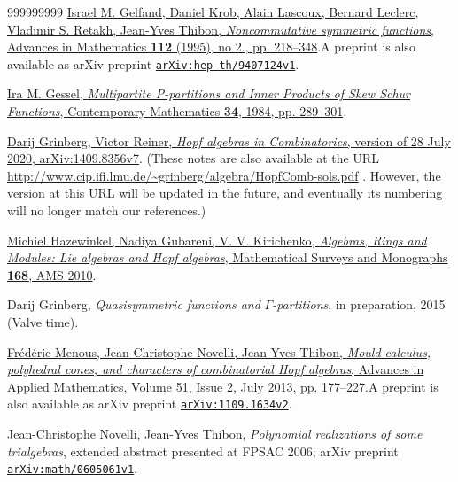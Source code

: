 \documentclass
[numbers=enddot,12pt,final,onecolumn,notitlepage,abstracton]{scrartcl}%
\theoremstyle{definition}
\newenvironment{noncompile}{}{}
\begin{document}
\begin{thebibliography}{999999999}
\href{https://doi.org/10.1006/aima.1995.1032}{Israel
M. Gelfand, Daniel Krob, Alain Lascoux, Bernard Leclerc, Vladimir S. Retakh,
Jean-Yves Thibon, \textit{Noncommutative symmetric functions}, Advances in
Mathematics \textbf{112} (1995), no 2., pp. 218--348}.\newline A preprint is
also available as arXiv preprint
\texttt{\href{https://arxiv.org/abs/hep-th/9407124v1}{arXiv:hep-th/9407124v1}}.

%
\href{http://people.brandeis.edu/~gessel/homepage/papers/multipartite.pdf}{Ira
M. Gessel, \textit{Multipartite P-partitions and Inner Products of Skew Schur
Functions}, Contemporary Mathematics \textbf{34}, 1984, pp. 289--301}.

\href{https://arxiv.org/abs/1409.8356v7}{Darij
Grinberg, Victor Reiner, \textit{Hopf algebras in Combinatorics}, version of
28 July 2020, arXiv:1409.8356v7}. \newline(These notes are also available at
the URL \url{http://www.cip.ifi.lmu.de/~grinberg/algebra/HopfComb-sols.pdf} .
However, the version at this URL will be updated in the future, and eventually
its numbering will no longer match our references.)

\href{https://bookstore.ams.org/surv-168}{Michiel
Hazewinkel, Nadiya Gubareni, V. V. Kirichenko, \textit{Algebras, Rings and
Modules: Lie algebras and Hopf algebras}, Mathematical Surveys and Monographs
\textbf{168}, AMS 2010}.

\begin{noncompile}


Darij Grinberg, \textit{Quasisymmetric
functions and }$\Gamma$\textit{-partitions}, in preparation, 2015 (Valve time).
\end{noncompile}

%
\href{https://doi.org/10.1016/j.aam.2013.02.003}{Fr\'{e}d\'{e}ric Menous,
Jean-Christophe Novelli, Jean-Yves Thibon, \textit{Mould calculus, polyhedral
cones, and characters of combinatorial Hopf algebras}, Advances in Applied
Mathematics, Volume 51, Issue 2, July 2013, pp. 177--227.}\newline A preprint
is also available as arXiv preprint
\texttt{\href{https://arxiv.org/abs/1109.1634v2}{arXiv:1109.1634v2}}.

Jean-Christophe Novelli, Jean-Yves Thibon,
\textit{Polynomial realizations of some trialgebras}, extended abstract
presented at FPSAC 2006; arXiv preprint
\texttt{\href{https://arxiv.org/abs/math/0605061v1}{arXiv:math/0605061v1}}.


\end{thebibliography}
\end{document}
